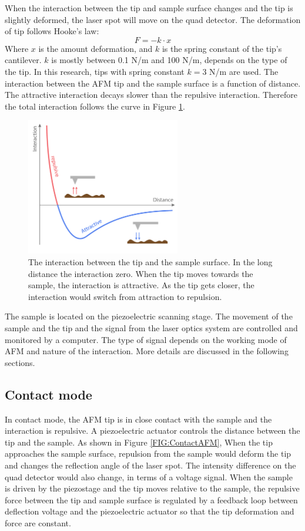 \documentclass[pdflatex, sectionletters, 12pt, final, phd]{pittetd}    %
\begin{document}
When the interaction between the tip and sample surface changes and the tip is slightly deformed, the laser spot will move on the quad detector. The deformation of tip follows Hooke's law:
$$F = -k \cdot x$$
Where $x$ is the amount deformation, and $k$ is the spring constant of the tip's cantilever. $k$ is mostly between 0.1 N/m and 100 N/m, depends on the type of the tip. In this research, tips with spring constant $k = 3$ N/m are used. The interaction between the AFM tip and the sample surface is a function of distance. The attractive interaction decays slower than the repulsive interaction. Therefore the total interaction follows the curve in Figure \ref{FIG:Interaction}.

\begin{figure}[h!]
	\centering
	\includegraphics[width=0.6\textwidth]{Drawing/Interaction.pdf}
	\caption[The interaction between the tip and the sample surface]{The interaction between the tip and the sample surface. In the long distance the interaction zero. When the tip moves towards the sample, the interaction is attractive. As the tip gets closer, the interaction would switch from attraction to repulsion.}
	\label{FIG:Interaction}
\end{figure}

The sample is located on the piezoelectric scanning stage. The movement of the sample and the tip and the signal from the laser optics system are controlled and monitored by a computer. The type of signal depends on the working mode of AFM and nature of the interaction. More details are discussed in the following sections. 

\subsection{Contact mode}

In contact mode, the AFM tip is in close contact with the sample and the interaction is repulsive. A piezoelectric actuator controls the distance between the tip and the sample. As shown in Figure \ref{FIG:ContactAFM}, When the tip approaches the sample surface, repulsion from the sample would deform the tip and changes the reflection angle of the laser spot. The intensity difference on the quad detector would also change, in terms of a voltage signal. When the sample is driven by the piezostage and the tip moves relative to the sample, the repulsive force between the tip and sample surface is regulated by a feedback loop between deflection voltage and the piezoelectric actuator so that the tip deformation and force are constant. 
\end{document}
